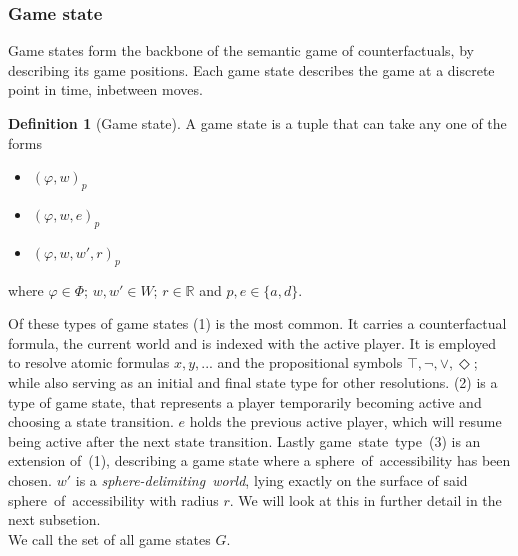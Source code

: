 \documentclass[a4paper,american]{paper}
\theoremstyle{definition}\newtheorem{definition}{Definition}
\begin{document}
\subsubsection{Game state}
Game states form the backbone of the semantic game of counterfactuals, by describing its game positions. Each game state describes the game at a discrete point in time, inbetween moves.
\begin{definition}[Game state]
A game state is a tuple that can take any one of the forms
\begin{itemize}
	\item[(1)] $(\varphi ,w)_p$
	\item[(2)] $(\varphi ,w, e)_p$
	\item[(3)] $(\varphi ,w,w',r)_p$
\end{itemize}
where $\varphi\in\Phi$; $w,w'\in W$; $r\in\mathbb{R}$ and $p,e\in\{ a,d\}$.
\end{definition}
\noindent Of these types of game states (1) is the most common. It carries a counterfactual formula, the current world and is indexed with the active player. It is employed to resolve atomic formulas $x,y,...$ and the propositional symbols $\top,\neg,\vee,\Diamond$; while also serving as an initial and final state type for other resolutions. (2) is a type of game state, that represents a player temporarily becoming active and choosing a state transition. $e$ holds the previous active player, which will resume being active after the next state transition. Lastly game~state~type~(3) is an extension of~(1), describing a game state where a sphere~of~accessibility has been chosen. $w'$ is a \textit{sphere-delimiting~world}, lying exactly on the surface of said sphere~of~accessibility with radius $r$. We will look at this in further detail in the next subsetion.\\
We call the set of all game states $G$.
\end{document}
